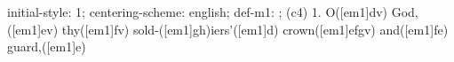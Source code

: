 initial-style: 1;
centering-scheme: english;
def-m1: \grealign;
(c4) 1. O([em1]dv) God, ([em1]ev) thy([em1]fv) sold-([em1]gh)iers'([em1]d) crown([em1]efgv) and([em1]fe) guard,([em1]e)